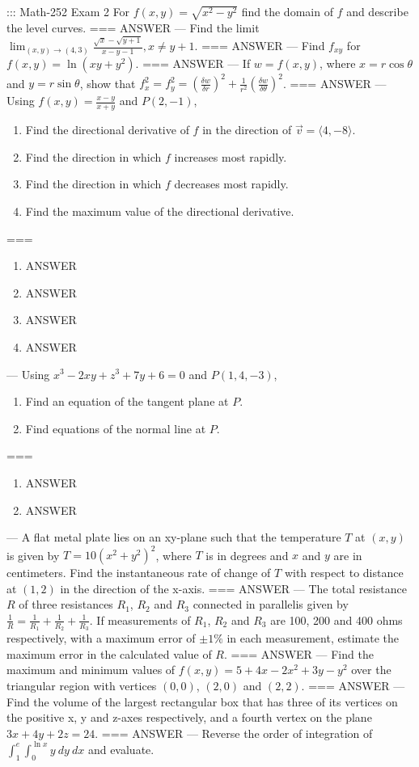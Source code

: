 ::: Math-252 Exam 2
For \(f(x,y)=\sqrt{x^2-y^2}\) find the domain of \(f\) and describe the level
curves.
===
ANSWER
---
Find the limit \(\lim_{(x,y)\to(4,3)}\frac{\sqrt x-\sqrt{y+1}}{x-y-1},x\neq
y+1\).
===
ANSWER
---
Find \(f_{xy}\) for \(f(x,y)=\ln(xy+y^2)\).
===
ANSWER
---
If \(w=f(x,y)\), where \(x=r\cos\theta\) and \(y=r\sin\theta\), show that
\(f_x^2=f_y^2=(\frac{\delta w}{\delta r})^2+\frac{1}{r^2}(\frac{\delta
w}{\delta\theta})^2\).
===
ANSWER
---
Using \(f(x,y)=\frac{x-y}{x+y}\) and \(P(2,-1)\),
\begin{enumerate}[label=\alph*.]
  \item Find the directional derivative of \(f\) in the direction of \(\vec
    v=\langle 4,-8\rangle\).
  \item Find the direction in which \(f\) increases most rapidly.
  \item Find the direction in which \(f\) decreases most rapidly.
  \item Find the maximum value of the directional derivative.
\end{enumerate}
===
\begin{enumerate}[label=\alph*.]
  \item ANSWER
  \item ANSWER
  \item ANSWER
  \item ANSWER
\end{enumerate}
---
Using \(x^3-2xy+z^3+7y+6=0\) and \(P(1,4,-3)\),
\begin{enumerate}[label=\alph*.]
  \item Find an equation of the tangent plane at \(P\).
  \item Find equations of the normal line at \(P\).
\end{enumerate}
===
\begin{enumerate}[label=\alph*.]
  \item ANSWER
  \item ANSWER
\end{enumerate}
---
A flat metal plate lies on an xy-plane such that the temperature \(T\) at
\((x,y)\) is given by \(T=10(x^2+y^2)^2\), where \(T\) is in degrees and \(x\)
and \(y\) are in centimeters. Find the instantaneous rate of change of \(T\)
with respect to distance at \((1,2)\) in the direction of the x-axis.
===
ANSWER
---
The total resistance \(R\) of three resistances \(R_1\), \(R_2\) and \(R_3\)
connected in parallelis given by
\(\frac{1}{R}=\frac{1}{R_1}+\frac{1}{R_2}+\frac{1}{R_3}\). If measurements of
\(R_1\), \(R_2\) and \(R_3\) are 100, 200 and 400 ohms respectively, with a
maximum error of \(\pm 1\%\) in each measurement, estimate the maximum error in
the calculated value of \(R\).
===
ANSWER
---
Find the maximum and minimum values of \(f(x,y)=5+4x-2x^2+3y-y^2\) over the
triangular region with vertices \((0,0)\), \((2,0)\) and \((2,2)\).
===
ANSWER
---
Find the volume of the largest rectangular box that has three of its vertices on
the positive x, y and z-axes respectively, and a fourth vertex on the plane
\(3x+4y+2z=24\).
===
ANSWER
---
Reverse the order of integration of \(\int_1^e\int_0^{\ln x}y\ dy\ dx\) and
evaluate.

